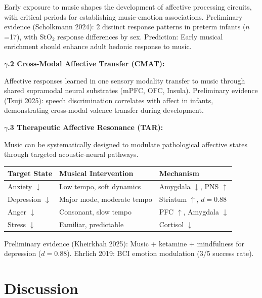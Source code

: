 \documentclass[9pt,onecolumn]{article}
\begin{document}
Early exposure to music shapes the development of affective processing circuits, with critical periods for establishing music-emotion associations. Preliminary evidence (Scholkmann 2024): 2 distinct response patterns in preterm infants ($n$=17), with StO$_2$ response differences by sex. Prediction: Early musical enrichment should enhance adult hedonic response to music.

\textbf{$\gamma$.2 Cross-Modal Affective Transfer (CMAT):}

Affective responses learned in one sensory modality transfer to music through shared supramodal neural substrates (mPFC, OFC, Insula). Preliminary evidence (Tsuji 2025): speech discrimination correlates with affect in infants, demonstrating cross-modal valence transfer during development.

\textbf{$\gamma$.3 Therapeutic Affective Resonance (TAR):}

Music can be systematically designed to modulate pathological affective states through targeted acoustic-neural pathways.

\begin{center}
\small
\begin{tabular}{@{}lll@{}}
\toprule
\textbf{Target State} & \textbf{Musical Intervention} & \textbf{Mechanism} \\
\midrule
Anxiety $\downarrow$ & Low tempo, soft dynamics & Amygdala $\downarrow$, PNS $\uparrow$ \\
Depression $\downarrow$ & Major mode, moderate tempo & Striatum $\uparrow$, $d=0.88$ \\
Anger $\downarrow$ & Consonant, slow tempo & PFC $\uparrow$, Amygdala $\downarrow$ \\
Stress $\downarrow$ & Familiar, predictable & Cortisol $\downarrow$ \\
\bottomrule
\end{tabular}
\end{center}

Preliminary evidence (Kheirkhah 2025): Music + ketamine + mindfulness for depression ($d=0.88$). Ehrlich 2019: BCI emotion modulation (3/5 success rate).



\section{Discussion}
\end{document}
